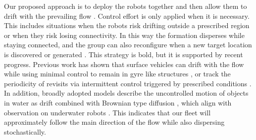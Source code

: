 \documentclass[conference]{IEEEconf}
\theoremstyle{plain}
\begin{document}



Our proposed approach is to deploy the robots together and then allow them to drift with the prevailing flow . Control effort is only applied when it is necessary. This includes situations when the robots risk drifting outside a prescribed region or when they risk losing connectivity. In this way the formation disperses while staying connected, and the group can also reconfigure when a new target location is discovered or generated \cite{butler2025}. This strategy is bold, but it is supported by recent progress. Previous work has shown that surface vehicles can drift with the flow while using minimal control to remain in gyre like structures \cite{wei2019}, or track the periodicity of revisits via intermittent control triggered by prescribed conditions \cite{knizhnik2022}. In addition, broadly adopted models describe the uncontrolled motion of objects in water as drift combined with Brownian type diffusion \cite{taylor1922, okubo1971, majda1999}, which align with observation on underwater robots \cite{berlinger2021, quattrini2023}. This indicates that our fleet will approximately follow the main direction of the flow while also dispersing stochastically.
\end{document}
